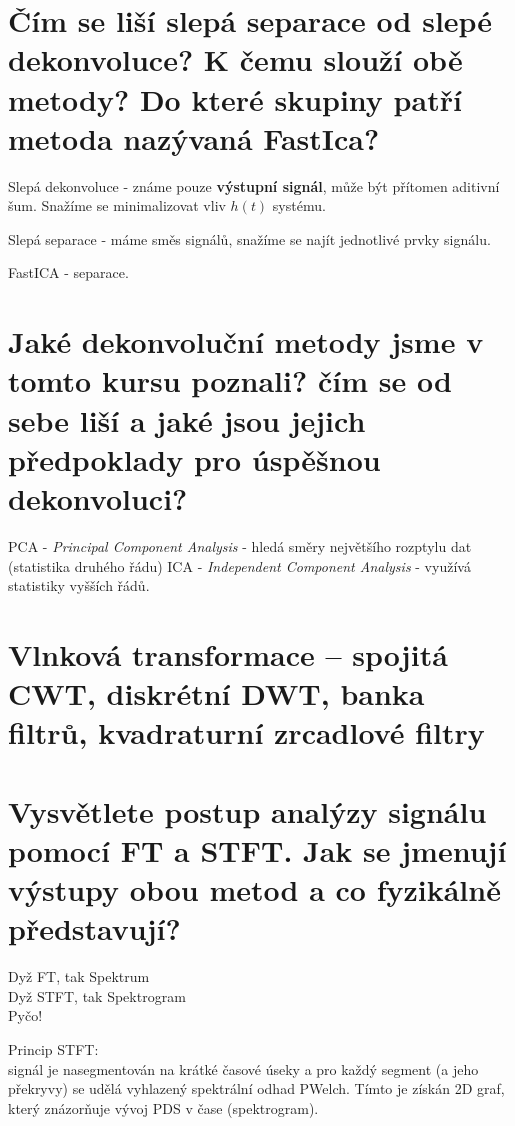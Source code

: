 \documentclass[a4paper,12pt]{article}   %
\newcommand{\mt}[1]{$#1$}
\begin{document}
\section{Čím se liší slepá separace od slepé dekonvoluce? K čemu slouží obě metody? Do které skupiny patří metoda nazývaná FastIca?}

Slepá dekonvoluce - známe pouze \textbf{výstupní signál}, může být přítomen aditivní šum. Snažíme se minimalizovat vliv \mt{h(t)} systému. 

Slepá separace - máme směs signálů, snažíme se najít jednotlivé prvky signálu.

FastICA - separace.


\section{Jaké dekonvoluční metody jsme v tomto kursu poznali? čím se od sebe liší a jaké jsou jejich předpoklady pro úspěšnou dekonvoluci?}

\begin{outline}
        \1 PCA - \textit{Principal Component Analysis} - hledá směry největšího rozptylu dat (statistika druhého řádu)
        \1 ICA - \textit{Independent Component Analysis} - využívá statistiky vyšších řádů.
\end{outline}



\clearpage 
{} %
\section*{Vlnková transformace – spojitá CWT, diskrétní DWT, banka filtrů, kvadraturní zrcadlové filtry}

\section{Vysvětlete postup analýzy signálu pomocí FT a STFT. Jak se jmenují výstupy obou metod a co fyzikálně představují?}
Dyž FT, tak Spektrum\\
Dyž STFT, tak Spektrogram\\
Pyčo!

Princip STFT:\\
signál je nasegmentován na krátké časové úseky a pro každý segment (a jeho překryvy) se udělá vyhlazený spektrální odhad PWelch. Tímto je získán 2D graf, který znázorňuje vývoj PDS v čase (spektrogram).
\end{document}
